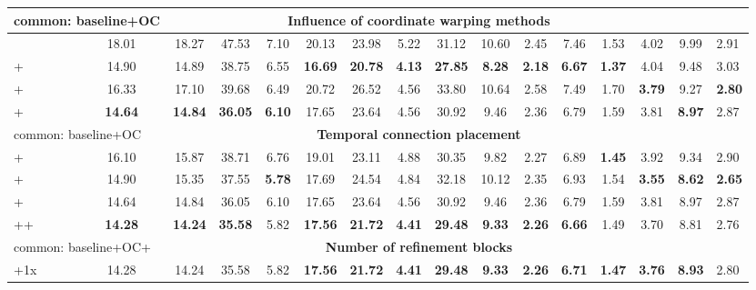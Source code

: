 \documentclass[runningheads]{llncs}
\begin{document}
\begin{table}[]
\begin{adjustbox}{max width=\textwidth}
\begin{tabular}{l|ccccc|cc|cc|ccc|ccc}
\multicolumn{2}{|l}{common: baseline+OC} & \multicolumn{12}{c}{\textbf{Influence of coordinate warping methods}} & \multicolumn{2}{l|}{} \\ \hline
\multicolumn{1}{|l|}{} & 18.01 & 18.27 & 47.53 & 7.10 & 20.13 & 23.98 & 5.22 & 31.12 & 10.60 & 2.45 & 7.46 & 1.53 & 4.02 & 9.99 & \multicolumn{1}{|l|}{2.91} \\
\multicolumn{1}{|l|}{+} & 14.90 & 14.89 & 38.75 & 6.55 & \textbf{16.69} & \textbf{20.78} & \textbf{4.13} & \textbf{27.85} & \textbf{8.28} & \textbf{2.18} & \textbf{6.67} & \textbf{1.37} & 4.04 & 9.48 & \multicolumn{1}{|l|}{3.03} \\
\multicolumn{1}{|l|}{+} & 16.33 & 17.10 & 39.68 & 6.49 & 20.72 & 26.52 & 4.56 & 33.80 & 10.64 & 2.58 & 7.49 & 1.70 & \textbf{3.79} & 9.27 & \multicolumn{1}{|l|}{\textbf{2.80}} \\
\multicolumn{1}{|l|}{+} & \textbf{14.64} & \textbf{14.84} & \textbf{36.05} & \textbf{6.10} & 17.65 & 23.64 & 4.56 & 30.92 & 9.46 & 2.36 & 6.79 & 1.59 & 3.81 & \textbf{8.97} & \multicolumn{1}{|l|}{2.87} \\ \hline \hline
\multicolumn{2}{|l}{common: baseline+OC} & \multicolumn{12}{c}{\textbf{Temporal connection placement}} & \multicolumn{2}{l|}{} \\ \hline
\multicolumn{1}{|l|}{+} & 16.10 & 15.87 & 38.71 & 6.76 & 19.01 & 23.11 & 4.88 & 30.35 & 9.82 & 2.27 & 6.89 & \textbf{1.45} & 3.92 & 9.34 & \multicolumn{1}{|l|}{2.90} \\
\multicolumn{1}{|l|}{+} & 14.90 & 15.35 & 37.55 & \textbf{5.78} & 17.69 & 24.54 & 4.84 & 32.18 & 10.12 & 2.35 & 6.93 & 1.54 & \textbf{3.55} & \textbf{8.62} & \multicolumn{1}{|l|}{\textbf{2.65}} \\
\multicolumn{1}{|l|}{+} & 14.64 & 14.84 & 36.05 & 6.10 & 17.65 & 23.64 & 4.56 & 30.92 & 9.46 & 2.36 & 6.79 & 1.59 & 3.81 & 8.97 & \multicolumn{1}{|l|}{2.87} \\
\multicolumn{1}{|l|}{++ }  & \textbf{14.28} & \textbf{14.24} & \textbf{35.58} & 5.82 & \textbf{17.56} & \textbf{21.72} & \textbf{4.41} & \textbf{29.48} & \textbf{9.33} & \textbf{2.26} & \textbf{6.66} & 1.49 & 3.70 & 8.81 & \multicolumn{1}{|l|}{2.76} \\ \hline \hline
\multicolumn{2}{|l}{common: baseline+OC+} & \multicolumn{12}{c}{\textbf{Number of refinement blocks}} & \multicolumn{2}{l|}{} \\ \hline
\multicolumn{1}{|l|}{+1x} & 14.28 & 14.24 & 35.58 & 5.82 & \textbf{17.56} & \textbf{21.72} & \textbf{4.41} & \textbf{29.48} & \textbf{9.33} & \textbf{2.26} & \textbf{6.71} & \textbf{1.47} & \textbf{3.76} & \textbf{8.93} & \multicolumn{1}{|l|}{2.80} \\

\end{tabular}
\end{adjustbox}
\end{table}
\end{document}
